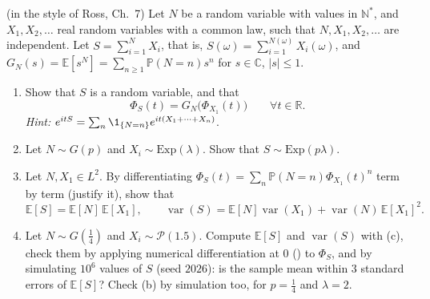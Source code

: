 \begin{exercise}\label{ex:cf-random-sums}
\hard (in the style of Ross, Ch.~7) Let $N$ be a random variable with values in $\mathbb N^*$,
and $X_1,X_2,\dots$ real random variables with a common law, such that $N,X_1,X_2,\dots$ are
independent. Let $S=\sum_{i=1}^NX_i$, that is, $S(\omega)=\sum_{i=1}^{N(\omega)}X_i(\omega)$, and
$G_N(s)=\mathbb E[s^N]=\sum_{n\ge1}\mathbb P(N=n)s^n$ for $s\in\mathbb C$, $|s|\le1$.
\begin{enumerate}[label=(\alph*)]
  \item Show that $S$ is a random variable, and that
    \[
      \Phi_S(t)=G_N\big(\Phi_{X_1}(t)\big)\qquad\forall t\in\mathbb R .
    \]
    \emph{Hint:} $e^{itS}=\sum_n\1_{\{N=n\}}e^{it(X_1+\dots+X_n)}$.
  \item Let $N\sim G(p)$ and $X_i\sim\mathrm{Exp}(\lambda)$. Show that $S\sim\mathrm{Exp}(p\lambda)$.
  \item Let $N,X_1\in L^2$. By differentiating $\Phi_S(t)=\sum_n\mathbb P(N=n)\Phi_{X_1}(t)^n$ term
    by term (justify it), show that
    \[
      \mathbb E[S]=\mathbb E[N]\,\mathbb E[X_1],\qquad
      \operatorname{var}(S)=\mathbb E[N]\operatorname{var}(X_1)+\operatorname{var}(N)\,\mathbb E[X_1]^2 .
    \]
  \item Let $N\sim G(\frac14)$ and $X_i\sim\mathcal P(1.5)$. Compute $\mathbb E[S]$ and
    $\operatorname{var}(S)$ with (c), check them by applying numerical differentiation at $0$
    () to $\Phi_S$, and by simulating $10^6$ values of $S$ (seed
    $2026$): is the sample mean within $3$ standard errors of $\mathbb E[S]$? Check (b) by
    simulation too, for $p=\frac14$ and $\lambda=2$.
\end{enumerate}
\end{exercise}

